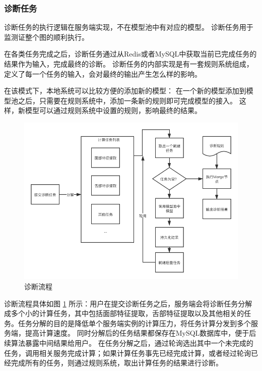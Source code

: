 \subsubsection{诊断任务}


诊断任务的执行逻辑在服务端实现，不在模型池中有对应的模型。 诊断任务用于监测证整个图的顺利执行。

在各类任务完成之后，诊断任务通过从Redis或者MySQL中获取当前已完成任务的结果作为输入，完成最终的诊断。 
诊断任务的内部实现是有一套规则系统组成，定义了每一个任务的输入，会对最终的输出产生怎么样的影响。

在该模式下，本地系统可以比较方便的添加新的模型： 在一个新的模型添加到模型池之后，只需要在规则系统中，添加一条新的规则即可完成模型的接入。
这样，新模型可以通过规则系统中设置的规则，影响最终的结果。

\begin{figure}[ht]
    \centering
    \includegraphics[width=12cm]{images/sketch2.png}
    \caption{诊断流程}
    \label{fig:sketch}
\end{figure}

诊断流程具体如图 \ref{fig:sketch} 所示：用户在提交诊断任务之后，服务端会将诊断任务分解成多个小的计算任务，其中包括面部特征提取，舌部特征提取以及其他相关的任务。任务分解的目的是降低单个服务端实例的计算压力，将任务计算分发到多个服务端，提高计算速度。
同时分解后的任务结果都保存在MySQL数据库中，便于后续算法暴露中间结果给用户。
在任务分解之后，通过轮询选出其中一个未完成的任务，调用相关服务完成计算；如果计算任务事先已经完成计算，或者经过轮询已经完成所有的任务，则通过规则系统，取出计算任务的结果进行诊断。



